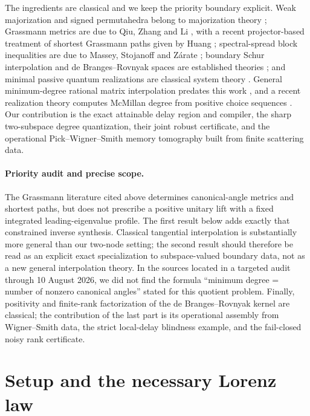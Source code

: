 \documentclass[11pt]{article}
\theoremstyle{definition}
\theoremstyle{remark}
\begin{document}
The ingredients are classical and we keep the priority boundary explicit.
Weak majorization and signed permutahedra belong to majorization theory
\cite{MarshallOlkinArnold2011}; Grassmann metrics are due to Qiu, Zhang and
Li \cite{QiuZhangLi2005}, with a recent projector-based treatment of shortest
Grassmann paths given by Huang \cite{Huang2026}; spectral-spread block inequalities are due to
Massey, Stojanoff and Z\'arate \cite{MasseyStojanoffZarate2021}; boundary
Schur interpolation and de Branges--Rovnyak spaces are established theories
\cite{deBrangesRovnyak1966,BolotnikovDym2006}; and minimal passive quantum
realizations are classical system theory
\cite{McMillan1952,GoughZhang2015}.  General minimum-degree rational matrix
interpolation predates this work \cite{BallKim1994}, and a recent realization
theory computes McMillan degree from positive choice sequences
\cite{FrazhoRanVanSchagen2026}.  Our contribution is the exact attainable
delay region and compiler, the sharp two-subspace degree quantization, their
joint robust certificate, and the operational Pick--Wigner--Smith memory
tomography built from finite scattering data.

\paragraph{Priority audit and precise scope.}
The Grassmann literature cited above determines canonical-angle metrics and
shortest paths, but does not prescribe a positive unitary lift with a fixed
integrated leading-eigenvalue profile.  The first result below adds exactly
that constrained inverse synthesis.  Classical tangential interpolation is
substantially more general than our two-node setting; the second result should
therefore be read as an explicit exact specialization to subspace-valued
boundary data, not as a new general interpolation theory.  In the sources
located in a targeted audit through 10 August 2026, we did not find the formula
``minimum degree = number of nonzero canonical angles'' stated for this
quotient problem.  Finally, positivity and finite-rank factorization of the
de Branges--Rovnyak kernel are classical; the contribution of the last part is
its operational assembly from Wigner--Smith data, the strict local-delay
blindness example, and the fail-closed noisy rank certificate.

\section{Setup and the necessary Lorenz law}
\end{document}
